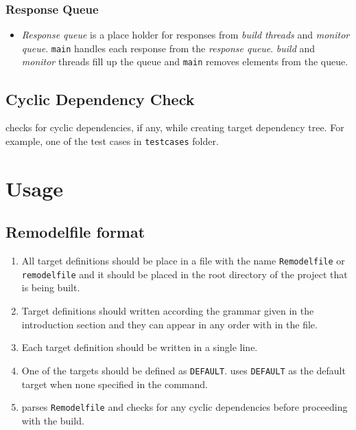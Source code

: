 \documentclass[12pt,letterpaper,titlepage, one-sided]{article}
\begin{document}
		\subsubsection{Response Queue}
		\begin{itemize}
		\item
		\textit{Response queue} is a place holder for responses from \textit{build threads} and \textit{monitor queue}. \texttt{main} handles each response from the \textit{response queue}. \textit{build} and \textit{monitor} threads fill up the queue and \texttt{main} removes elements from the queue.
		\end{itemize}
		
		\subsection{Cyclic Dependency Check}
		\remodel checks for cyclic dependencies, if any, while creating target dependency tree. For example, one of the test cases in \texttt{testcases} folder.\\
		
\section{Usage}
	\subsection{Remodelfile format}
	\begin{enumerate}
	\item
	All target definitions should be place in a file with the name \texttt{Remodelfile} or \texttt{remodelfile} and it should be placed in the root directory of the project that is being built.
	\item
	Target definitions should written according the grammar given in the introduction section and they can appear in any order with in the file. 
	\item
	Each target definition should be written in a single line.
	\item
	One of the targets should be defined as \texttt{DEFAULT}. \remodel uses \texttt{DEFAULT} as the default target when none specified in the command.
	\item
	\remodel parses \texttt{Remodelfile} and checks for any cyclic dependencies before proceeding with the build.
	\end{enumerate}
	
\end{document}
